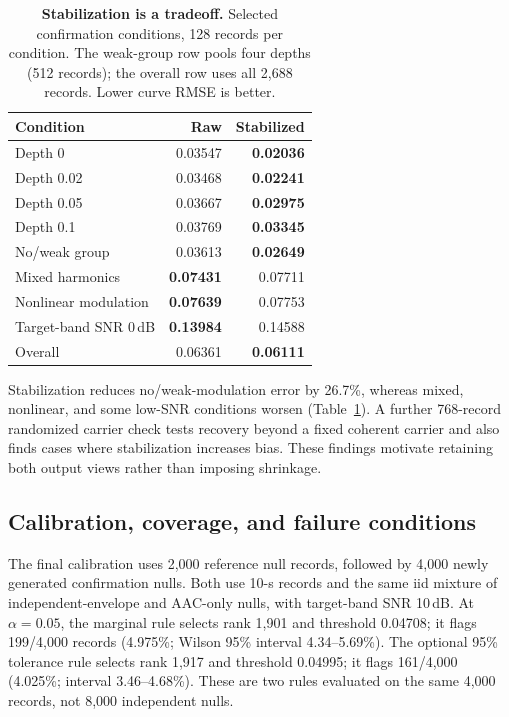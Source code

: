 \documentclass[10pt,twocolumn,letterpaper]{article}
\newcommand{\TableStyle}{\fontsize{8}{9.5}\selectfont\setlength{\tabcolsep}{3pt}\renewcommand{\arraystretch}{1.10}}
\begin{document}
\begin{table}[t]
\centering\TableStyle
\caption{\textbf{Stabilization is a tradeoff.} Selected confirmation
conditions, 128 records per condition. The weak-group row pools four
depths (512 records); the overall row uses all 2,688 records.
Lower curve RMSE is better.}
\label{tab:operator-stabilization}
\begin{tabular*}{\linewidth}{@{\extracolsep{\fill}}lrr@{}}
\toprule
Condition & Raw & Stabilized\\
\midrule
Depth 0 & 0.03547 & \textbf{0.02036}\\
Depth 0.02 & 0.03468 & \textbf{0.02241}\\
Depth 0.05 & 0.03667 & \textbf{0.02975}\\
Depth 0.1 & 0.03769 & \textbf{0.03345}\\
No/weak group & 0.03613 & \textbf{0.02649}\\
Mixed harmonics & \textbf{0.07431} & 0.07711\\
Nonlinear modulation & \textbf{0.07639} & 0.07753\\
Target-band SNR 0\,dB & \textbf{0.13984} & 0.14588\\
\midrule
Overall & 0.06361 & \textbf{0.06111}\\
\bottomrule
\end{tabular*}
\end{table}

Stabilization reduces no/weak-modulation error by 26.7\%, whereas mixed,
nonlinear, and some low-SNR conditions worsen
(Table~\ref{tab:operator-stabilization}). A further 768-record randomized
carrier check tests recovery beyond a fixed coherent carrier and
also finds cases where stabilization increases bias. These findings
motivate retaining both output views rather than imposing shrinkage.

\subsection{Calibration, coverage, and failure conditions}
The final calibration uses 2,000 reference null records, followed by
4,000 newly generated confirmation nulls. Both use 10-s records and
the same iid mixture of independent-envelope and AAC-only nulls,
with target-band SNR 10\,dB. At $\alpha=0.05$, the marginal rule
selects rank 1,901 and threshold 0.04708; it flags 199/4,000 records
(4.975\%; Wilson 95\% interval 4.34--5.69\%). The optional 95\%
tolerance rule selects rank 1,917 and threshold 0.04995; it flags
161/4,000 (4.025\%; interval 3.46--4.68\%). These are two rules
evaluated on the same 4,000 records, not 8,000 independent nulls.
\end{document}

